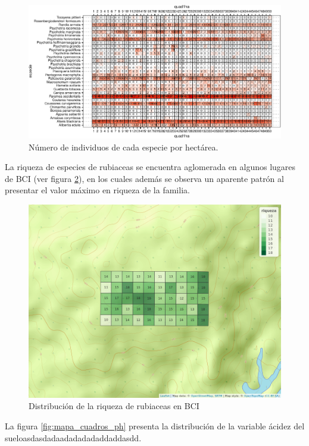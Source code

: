 \documentclass[11pt,]{article}
\begin{document}
\begin{figure}
\centering
\includegraphics{manuscrito_files/figure-latex/unnamed-chunk-3-1.pdf}
\caption{\label{fig:abun_sp_q}Número de individuos de cada especie por
hectárea.}
\end{figure}

La riqueza de especies de rubiaceas se encuentra aglomerada en algunos
lugares de BCI (ver figura \ref{fig:mapa_cuadros_riq}), en los cuales
además se observa un aparente patrón al presentar el valor máximo en
riqueza de la familia.

\begin{figure}
\centering
\includegraphics{mapa_cuadros_riq_rubic.png}
\caption{Distribución de la riqueza de rubiaceas en BCI
\label{fig:mapa_cuadros_riq}}
\end{figure}

La figura \ref{fig:mapa_cuadros_ph} presenta la distribución de la
variable ácidez del sueloasdasdadaadadadadaddaddasdd.
\end{document}
